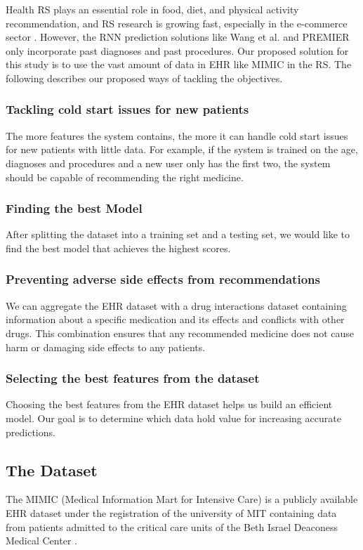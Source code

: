 Health RS plays an essential role in food, diet, and physical activity
recommendation, and RS research is growing fast, especially in the e-commerce
sector \cite{Tran2021b}. However, the RNN prediction solutions
like Wang et al. \cite{Wang} and PREMIER \cite{Bhoi2021} only incorporate past diagnoses and past
procedures. Our proposed solution for this study is to use the vast amount of
data in EHR like MIMIC in the RS.  The following describes our proposed ways of
tackling the objectives.


\subsubsection{
    Tackling cold start issues for new patients
}

The more features the system contains, the more it can handle cold start issues
for new patients with little data. For example, if the system is trained on the
age, diagnoses and procedures and a new user only has the first two, the system
should be capable of recommending the right medicine. 

\subsubsection{
Finding the best Model
}
After splitting the dataset into a training set and a testing set, we would
like to find the best model that achieves the highest scores.

\subsubsection{
    Preventing adverse side effects from recommendations
}
We can aggregate the EHR dataset with a drug interactions dataset containing
information about a specific medication and its effects and conflicts with
other drugs. This combination ensures that any recommended medicine does not
cause harm or damaging side effects to any patients. 

\subsubsection{
    Selecting the best features from the dataset
}
Choosing the best features from the EHR dataset helps us build an efficient
model. Our goal is to determine which data hold value for increasing accurate
predictions.


\subsection{
The Dataset 
}
The MIMIC (Medical Information Mart for Intensive Care) is a publicly
available EHR dataset under the registration of the university of MIT
containing data from patients admitted to the critical care units of the Beth
Israel Deaconess Medical Center \cite{Johnson2016}.

